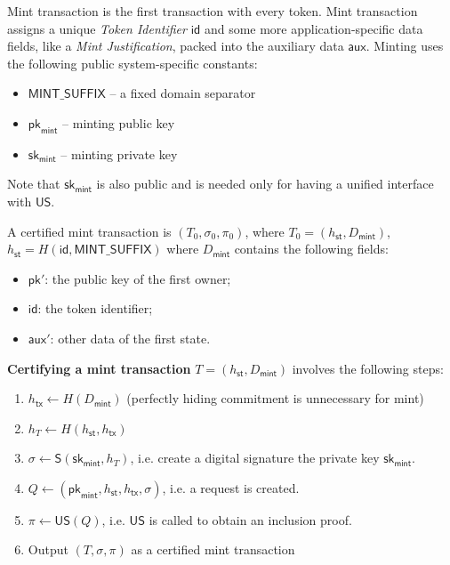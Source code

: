 \documentclass{article}
\newcommand{\sig}[0]{\mathsf{S}}
\newcommand{\pubkey}[0]{\mathsf{pk}}
\newcommand{\prikey}[0]{\mathsf{sk}}
\newcommand{\unisrv}[0]{\mathsf{US}}
\newcommand{\sthash}[0]{{h_\mathsf{st}}}
\newcommand{\txhash}[0]{{h_\mathsf{tx}}}
\newcommand{\auxd}[0]{\mathsf{aux}}
\begin{document}
Mint transaction is the first transaction with every token. Mint transaction assigns a unique \emph{Token Identifier} $\mathsf{id}$ and some more application-specific data fields, like a \emph{Mint Justification}, packed into the auxiliary data $\auxd$.
Minting uses the following public system-specific constants:
\begin{itemize}
\item $\mathsf{MINT\_SUFFIX}$ -- a fixed domain separator
\item $\pubkey_\mathsf{mint}$ -- minting public key
\item $\prikey_\mathsf{mint}$ -- minting private key
\end{itemize}
Note that $\prikey_\mathsf{mint}$ is also public and is needed only for having a unified interface with $\unisrv$.

A certified mint transaction is $(T_0, \sigma_0, \pi_0)$, where $T_0 = (\sthash, D_\mathsf{mint})$, $\sthash = H(\mathsf{id}, \mathsf{MINT\_SUFFIX})$ where $D_\mathsf{mint}$ contains the following fields:
\begin{itemize}
    \item $\pubkey'$: the public key of the first owner;
    \item $\mathsf{id}$: the token identifier;
    \item $\auxd'$: other data of the first state.
\end{itemize}
\medskip

\noindent\textbf{Certifying a mint transaction} $T = (\sthash, D_\mathsf{mint})$ involves the following steps:
\begin{enumerate}
	\item $\txhash \gets H(D_\mathsf{mint})$ (perfectly hiding commitment is unnecessary for mint)
	\item $h_T \gets H(\sthash, \txhash)$
	\item $\sigma \gets \sig(\prikey_\mathsf{mint}, h_T)$, i.e. create a digital signature the private key $\prikey_\mathsf{mint}$.
	\item $Q \gets (\pubkey_\mathsf{mint},\sthash,\txhash,\sigma)$, i.e. a request is created.
	\item $\pi\gets \unisrv(Q)$, i.e. $\unisrv$ is called to obtain an inclusion proof.
	\item Output $(T,\sigma,\pi)$ as a certified mint transaction
\end{enumerate}
\end{document}
